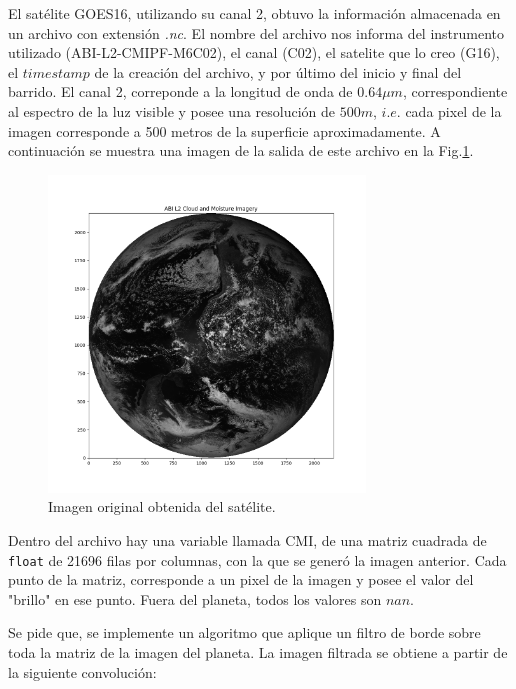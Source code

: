 \documentclass[a4paper]{article}
\begin{document}
El satélite GOES16, utilizando su canal 2, obtuvo la información almacenada en un archivo con extensión \textit{.nc}.
El nombre del archivo nos informa del instrumento utilizado (ABI-L2-CMIPF-M6C02), el canal (C02), el satelite que lo creo (G16), el $timestamp$ de la creación del archivo, y por último del inicio y final del barrido. 
El canal 2, correponde a la longitud de onda de $0.64 \mu m$, correspondiente al espectro de la luz visible y posee una resolución de $500m$, $i.e.$ cada pixel de la imagen corresponde a 500 metros de la superficie aproximadamente. A continuación se muestra una imagen de la salida de este archivo en la Fig.\ref{fig:imgsatelital}.

\begin{figure}[H]
	\begin{center}		
	\includegraphics[width=0.75\textwidth]{../imagenOriginal.png}
  	\caption{Imagen original obtenida del satélite.}
  	\label{fig:imgsatelital}
  	\end{center}
\end{figure}

Dentro del archivo hay una variable llamada CMI, de una matriz cuadrada de \texttt{float} de 21696 filas por columnas, con la que se generó la imagen anterior. Cada punto de la matriz, corresponde a un pixel de la imagen y posee el valor del "brillo" en ese punto. Fuera del planeta, todos los valores son $nan$.

Se pide que, se implemente un algoritmo que aplique un filtro de borde sobre toda la matriz de la imagen del planeta. La imagen filtrada se obtiene a partir de la siguiente convolución:
\end{document}

